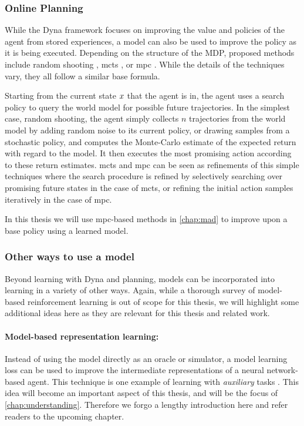 \subsubsection{Online Planning}

While the Dyna framework focuses on improving the value and policies of the agent from stored experiences, a model can also be used to improve the policy as it is being executed.
Depending on the structure of the MDP, proposed methods include random shooting \parencite{pets}, \ac{mcts} \parencite{silver2016mastering,schrittwieser2020mastering}, or \ac{mpc} \parencite{hansen2022temporal,hansen2024tdmpc}.
While the details of the techniques vary, they all follow a similar base formula.

Starting from the current state $x$ that the agent is in, the agent uses a search policy to query the world model for possible future trajectories.
In the simplest case, random shooting, the agent simply collects $n$ trajectories from the world model by adding random noise to its current policy, or drawing samples from a stochastic policy, and computes the Monte-Carlo estimate of the expected return with regard to the model.
It then executes the most promising action according to these return estimates.
\ac{mcts} and \ac{mpc} can be seen as refinements of this simple techniques where the search procedure is refined by selectively searching over promising future states in the case of \ac{mcts}, or refining the initial action samples iteratively in the case of \ac{mpc}.

In this thesis we will use \ac{mpc}-based methods in \autoref{chap:mad} to improve upon a base policy using a learned model.

\subsubsection{Other ways to use a model}

Beyond learning with Dyna and planning, models can be incorporated into learning in a variety of other ways.
Again, while a thorough survey of model-based reinforcement learning is out of scope for this thesis, we will highlight some additional ideas here as they are relevant for this thesis and related work.

\paragraph{Model-based representation learning:} Instead of using the model directly as an oracle or simulator, a model learning loss can be used to improve the intermediate representations of a neural network-based agent.
This technique is one example of learning with \emph{auxiliary} tasks \parencite{jaderberg2017reinforcement}.
This idea will become an important aspect of this thesis, and will be the focus of \autoref{chap:understanding}.
Therefore we forgo a lengthy introduction here and refer readers to the upcoming chapter.

